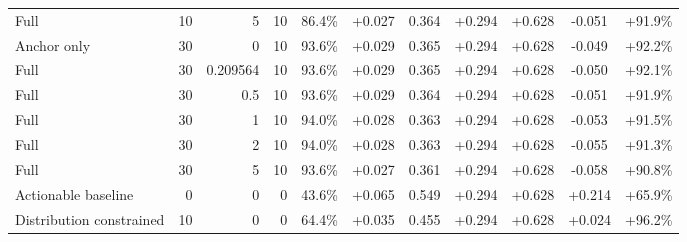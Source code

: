 \begin{table}[htbp]
\begin{tabular}{lrrrccccccc}
Full & 10 & 5 & 10 & 86.4\% & +0.027 & 0.364 & +0.294 & +0.628 & -0.051 & +91.9\% \\
Anchor only & 30 & 0 & 10 & 93.6\% & +0.029 & 0.365 & +0.294 & +0.628 & -0.049 & +92.2\% \\
Full & 30 & 0.209564 & 10 & 93.6\% & +0.029 & 0.365 & +0.294 & +0.628 & -0.050 & +92.1\% \\
Full & 30 & 0.5 & 10 & 93.6\% & +0.029 & 0.364 & +0.294 & +0.628 & -0.051 & +91.9\% \\
Full & 30 & 1 & 10 & 94.0\% & +0.028 & 0.363 & +0.294 & +0.628 & -0.053 & +91.5\% \\
Full & 30 & 2 & 10 & 94.0\% & +0.028 & 0.363 & +0.294 & +0.628 & -0.055 & +91.3\% \\
Full & 30 & 5 & 10 & 93.6\% & +0.027 & 0.361 & +0.294 & +0.628 & -0.058 & +90.8\% \\
Actionable baseline & 0 & 0 & 0 & 43.6\% & +0.065 & 0.549 & +0.294 & +0.628 & +0.214 & +65.9\% \\
Distribution constrained & 10 & 0 & 0 & 64.4\% & +0.035 & 0.455 & +0.294 & +0.628 & +0.024 & +96.2\% \\
\bottomrule
\end{tabular}
\end{table}
